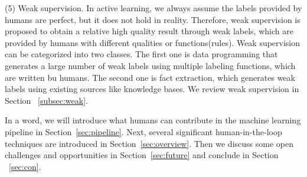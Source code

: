 (5) Weak supervision. In active learning, we always assume the labels provided by humans are perfect, but it does not hold in reality. Therefore, weak supervision is proposed to obtain a relative high quality result through weak labels, which are provided by humans with different qualities or functions(rules).  Weak supervision can be categorized into two classes. The first one is data programming that generates a large number of weak labels using multiple labeling functions, which are written bu humans. The second one is fact extraction, which generates weak labels using existing sources like knowledge bases. We review weak supervision  in Section ~\ref{subsec:weak}.

\fi

In a word, we will introduce what humans can contribute in the machine learning pipeline in Section~\ref{sec:pipeline}. Next, several significant human-in-the-loop techniques are introduced in Section~\ref{sec:overview}. Then we discuss some open challenges and opportunities in Section~\ref{sec:future} and conclude in Section ~\ref{sec:con}.

